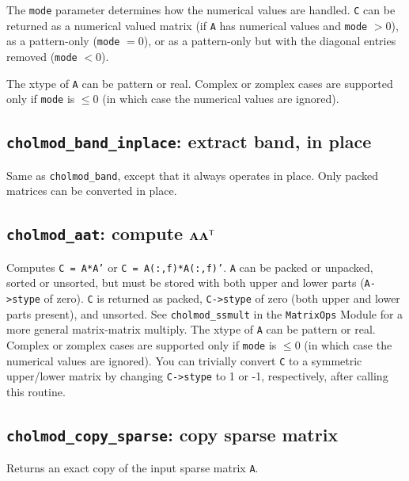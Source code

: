 \documentclass[11pt]{article}
\newcommand{\m}[1]{{\bf{#1}}}       %
\newcommand{\tr}{^{\sf T}}          %
\begin{document}
The \verb'mode' parameter determines how the numerical values are handled.
{\tt C} can be returned as a numerical valued matrix (if {\tt A} has numerical
values and {\tt mode} $> 0$), as a pattern-only ({\tt mode} $=0$), or as a
pattern-only but with the diagonal entries removed ({\tt mode} $< 0$).

The xtype of {\tt A} can be pattern or real.  Complex or zomplex cases are
supported only if {\tt mode} is $\le 0$ (in which case the numerical values are
ignored).

\subsection{{\tt cholmod\_band\_inplace}: extract band, in place}


Same as {\tt cholmod\_band}, except that it always operates in place.
Only packed matrices can be converted in place.

\subsection{{\tt cholmod\_aat}: compute $\m{AA}\tr$}


Computes {\tt C = A*A'} or {\tt C = A(:,f)*A(:,f)'}.
{\tt A} can be packed or unpacked, sorted or unsorted, but must be stored with
both upper and lower parts ({\tt A->stype} of zero).  {\tt C} is returned as
packed, {\tt C->stype} of zero (both upper and lower parts present), and
unsorted.  See {\tt cholmod\_ssmult} in the {\tt MatrixOps} Module for a more
general matrix-matrix multiply.  The xtype of {\tt A} can be pattern or real.
Complex or zomplex cases are supported only if {\tt mode} is $\le 0$ (in which
case the numerical values are ignored).  You can trivially convert {\tt C} to a
symmetric upper/lower matrix by changing {\tt C->stype} to 1 or -1,
respectively, after calling this routine.

\subsection{{\tt cholmod\_copy\_sparse}: copy sparse matrix}


Returns an exact copy of the input sparse matrix {\tt A}.
\end{document}
